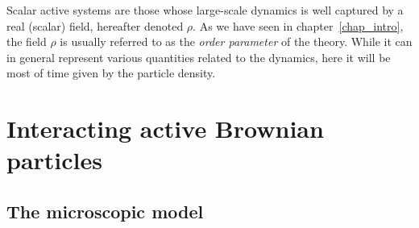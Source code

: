 
Scalar active systems are those whose large-scale dynamics is well captured by a real (scalar) field, hereafter denoted $\rho$. 
As we have seen in chapter~\ref{chap_intro}, the field $\rho$ is usually referred to as the \emph{order parameter} of the theory.
While it can in general represent various quantities related to the dynamics, here it will be most of time given by the particle density.





\section{Interacting active Brownian particles}

\subsection{The microscopic model}

